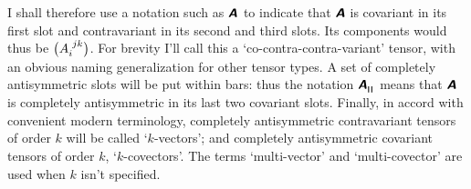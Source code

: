 \documentclass[\ifafour a4paper,12pt,\else a5paper,10pt,\fi%
onecolumn,oneside,article,%
british%
]{memoir}
\makeatletter
\newcommand*{\defquote}[1]{`#1'}
\theoremstyle{remark}
\theoremstyle{innote}
\newcommand*{\mathte}[1]{\textbf{\textit{\textsf{#1}}}}
\newcommand*{\citep}{\footcites}
\newcommand*{\amp}{\&}
\renewcommand*{\|}[1][]{\nonscript\,#1\vert\nonscript\;\mathopen{}}
\newcommand*{\sect}{\S}%
\newcommand*{\q}{}%
\DeclareRobustCommand*{\q}{%
  \mathord{\mathpalette\bigcdot@{}}%
}
\newcommand*{\bigcdot@scalefactor}{0.7}
\newcommand*{\bigcdot@widthfactor}{1.5}
\newcommand*{\bigcdot@}[2]{%
  \sbox0{$#1\vcenter{}$}%
  \sbox2{$#1\cdot\m@th$}%
  \hbox to \bigcdot@widthfactor\wd2{%
    \hfil
    \raise\ht0\hbox{%
      \scalebox{\bigcdot@scalefactor}{%
        \lower\ht0\hbox{$#1\bullet\m@th$}%
      }%
    }%
    \hfil
  }%
}
\newcommand*{\yA}{\mathte{A}}
\renewcommand*{\i}{\indices}
\newcommand*{\rul}{{\mkern2mu\rule[-0.1ex]{0.75pt}{1.1ex}\mkern2mu}}
\DeclarePairedDelimiter\mul{\rul}{\rul}%
\makeatother
\begin{document}
I shall therefore use a notation such as $\yA\i{_{\q}^{\q\q}}$ to indicate
that $\yA$ is covariant in its first slot and contravariant in its second
and third slots. Its components would thus be $\bigl(A\i{_{i}^{jk}}\bigr)$.
For brevity I'll call this a \defquote{co-contra-contra-variant} tensor,
with an obvious naming generalization for other tensor
types. %
A set of completely antisymmetric slots will be put within bars: thus the
notation $\yA\i{^{\q}_{\mul{\q\q}}}$ means that $\yA$ is completely
antisymmetric in its last two covariant slots. Finally, in accord with
convenient modern terminology, completely antisymmetric contravariant
tensors of order $k$ will be called \defquote{$k$-vectors}; and completely
antisymmetric covariant tensors of order $k$, \defquote{$k$-covectors}. The
terms \defquote{multi-vector} and \defquote{multi-covector} are used when
$k$ isn't specified.
\end{document}

